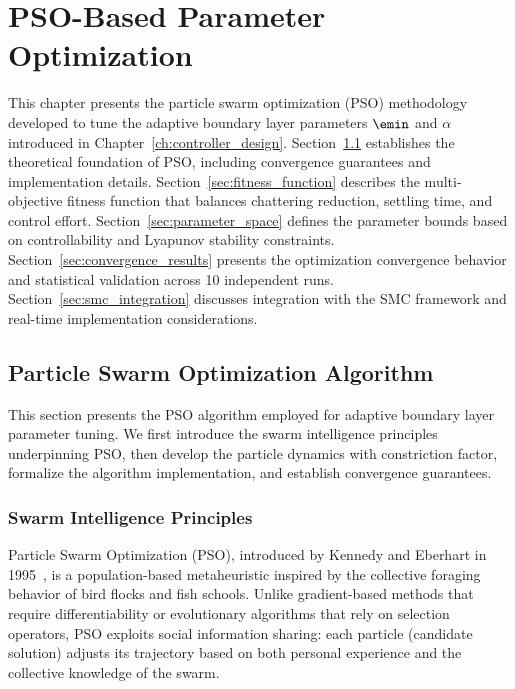 \chapter{PSO-Based Parameter Optimization}
\label{ch:pso_optimization}

This chapter presents the particle swarm optimization (PSO) methodology developed to tune the adaptive boundary layer parameters $\emin$ and $\alpha$ introduced in Chapter~\ref{ch:controller_design}. Section~\ref{sec:pso_algorithm} establishes the theoretical foundation of PSO, including convergence guarantees and implementation details. Section~\ref{sec:fitness_function} describes the multi-objective fitness function that balances chattering reduction, settling time, and control effort. Section~\ref{sec:parameter_space} defines the parameter bounds based on controllability and Lyapunov stability constraints. Section~\ref{sec:convergence_results} presents the optimization convergence behavior and statistical validation across 10 independent runs. Section~\ref{sec:smc_integration} discusses integration with the SMC framework and real-time implementation considerations.

\section{Particle Swarm Optimization Algorithm}
\label{sec:pso_algorithm}

This section presents the PSO algorithm employed for adaptive boundary layer parameter tuning. We first introduce the swarm intelligence principles underpinning PSO, then develop the particle dynamics with constriction factor, formalize the algorithm implementation, and establish convergence guarantees.

\subsection{Swarm Intelligence Principles}
\label{subsec:swarm_intelligence}

Particle Swarm Optimization (PSO), introduced by Kennedy and Eberhart in 1995~\cite{kennedy1995particle}, is a population-based metaheuristic inspired by the collective foraging behavior of bird flocks and fish schools. Unlike gradient-based methods that require differentiability or evolutionary algorithms that rely on selection operators, PSO exploits social information sharing: each particle (candidate solution) adjusts its trajectory based on both personal experience and the collective knowledge of the swarm.

